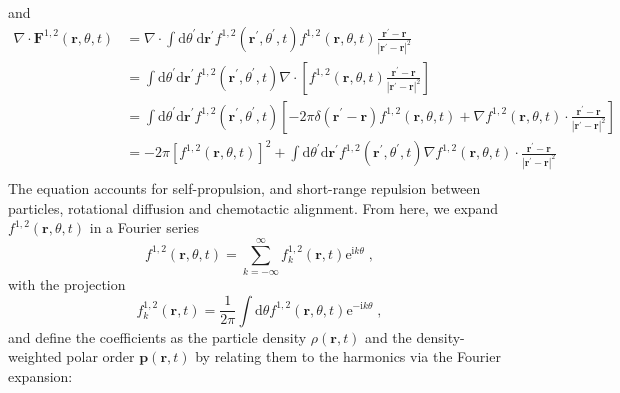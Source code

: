 \documentclass{article}
\begin{document}
and 
\begin{equation}
    \begin{aligned}
        \nabla\cdot\mathbf{F}^{1,2}\left( \mathbf{r},\theta ,t \right) &=\nabla \cdot \int{\mathrm{d}\theta ^{\prime}\mathrm{d}\mathbf{r}^{\prime}f^{1,2}\left( \mathbf{r}^{\prime},\theta ^{\prime},t \right) f^{1,2}\left( \mathbf{r},\theta ,t \right) \frac{\mathbf{r}^{\prime}-\mathbf{r}}{\left| \mathbf{r}^{\prime}-\mathbf{r} \right|^2}}\\
        &=\int{\mathrm{d}\theta ^{\prime}\mathrm{d}\mathbf{r}^{\prime}f^{1,2}\left( \mathbf{r}^{\prime},\theta ^{\prime},t \right) \nabla \cdot \left[ f^{1,2}\left( \mathbf{r},\theta ,t \right) \frac{\mathbf{r}^{\prime}-\mathbf{r}}{\left| \mathbf{r}^{\prime}-\mathbf{r} \right|^2} \right]}\\
        &=\int{\mathrm{d}\theta ^{\prime}\mathrm{d}\mathbf{r}^{\prime}f^{1,2}\left( \mathbf{r}^{\prime},\theta ^{\prime},t \right) \left[ -2\pi \delta \left( \mathbf{r}^{\prime}-\mathbf{r} \right) f^{1,2}\left( \mathbf{r},\theta ,t \right) +\nabla f^{1,2}\left( \mathbf{r},\theta ,t \right) \cdot \frac{\mathbf{r}^{\prime}-\mathbf{r}}{\left| \mathbf{r}^{\prime}-\mathbf{r} \right|^2} \right]}\\
        &=-2\pi \left[ f^{1,2}\left( \mathbf{r},\theta ,t \right) \right] ^2+\int{\mathrm{d}\theta ^{\prime}\mathrm{d}\mathbf{r}^{\prime}f^{1,2}\left( \mathbf{r}^{\prime},\theta ^{\prime},t \right) \nabla f^{1,2}\left( \mathbf{r},\theta ,t \right) \cdot \frac{\mathbf{r}^{\prime}-\mathbf{r}}{\left| \mathbf{r}^{\prime}-\mathbf{r} \right|^2}}\\
    \end{aligned}
\end{equation}
The equation accounts for self-propulsion, and short-range repulsion between particles, rotational diffusion and chemotactic alignment.
From here, we expand $f^{1,2}\left( \mathbf{r},\theta ,t \right)$ in a Fourier series 
\begin{equation}
    f ^{1,2}\left( \mathbf{r},\theta ,t \right) =\sum_{k=-\infty}^{\infty}{f _{k}^{1,2}\left( \mathbf{r},t \right) \mathrm{e}^{\mathrm{i}k\theta}}\;,
\end{equation} 
with the projection 
\begin{equation}
    \label{eq:fourierCoefficients}
    f _{k}^{1,2}\left( \mathbf{r},t \right) =\frac{1}{2\pi}\int{\mathrm{d}\theta f ^{1,2}\left( \mathbf{r},\theta ,t \right) \mathrm{e}^{-\mathrm{i}k\theta}}\;,
\end{equation}
and define the coefficients  as the particle density $ \rho\left(\mathbf{r}, t\right)$ and the density-weighted polar order $\boldsymbol{p}\left(\mathbf{r}, t\right)$ by relating them to the harmonics via the Fourier expansion:
\end{document}
